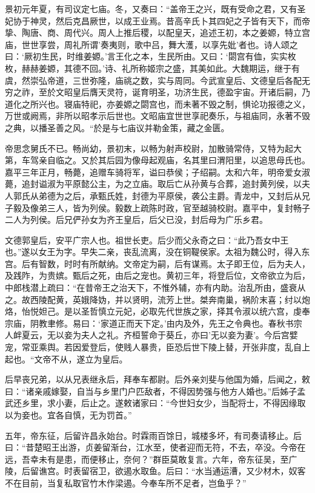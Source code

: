 \documentclass[12pt,UTF8]{ctexbook}
\begin{document}
景初元年夏，有司议定七庙。冬，又奏曰：“盖帝王之兴，既有受命之君，又有圣妃协于神灵，然后克昌厥世，以成王业焉。昔高辛氏卜其四妃之子皆有天下，而帝挚、陶唐、商、周代兴。周人上推后稷，以配皇天，追述王初，本之姜嫄，特立宫庙，世世享尝，周礼所谓'奏夷则，歌中吕，舞大濩，以享先妣'者也。诗人颂之曰：‘厥初生民，时维姜嫄。’言王化之本，生民所由。又曰：‘閟宫有侐，实实枚枚，赫赫姜嫄，其德不回。’诗、礼所称姬宗之盛，其美如此。大魏期运，继于有虞，然崇弘帝道，三世弥隆，庙祧之数，实与周同。今武宣皇后、文德皇后各配无穷之祚，至於文昭皇后膺天灵符，诞育明圣，功济生民，德盈宇宙。开诸后嗣，乃道化之所兴也。寝庙特祀，亦姜嫄之閟宫也，而未著不毁之制，惧论功报德之义，万世或阙焉，非所以昭孝示后世也。文昭庙宜世世享祀奏乐，与祖庙同，永著不毁之典，以播圣善之风。“於是与七庙议并勒金策，藏之金匮。

帝思念舅氏不已。畅尚幼，景初末，以畅为射声校尉，加散骑常侍，又特为起大第，车驾亲自临之。又於其后园为像母起观庙，名其里曰渭阳里，以追思母氏也。嘉平三年正月，畅薨，追赠车骑将军，谥曰恭侯；子绍嗣。太和六年，明帝爱女淑薨，追封谥淑为平原懿公主，为之立庙。取后亡从孙黄与合葬，追封黄列侯，以夫人郭氏从弟德为之后，承甄氏姓，封德为平原侯，袭公主爵。青龙中，又封后从兄子毅及像弟三人，皆为列侯。毅数上疏陈时政，官至越骑校尉。嘉平中，复封畅子二人为列侯。后兄俨孙女为齐王皇后，后父已没，封后母为广乐乡君。

文德郭皇后，安平广宗人也。祖世长吏。后少而父永奇之曰：“此乃吾女中王也。”遂以女王为字。早失二亲，丧乱流离，没在铜鞮侯家。太祖为魏公时，得入东宫。后有智数，时时有所献纳。文帝定为嗣，后有谋焉。太子即王位，后为夫人，及践阼，为贵嫔。甄后之死，由后之宠也。黄初三年，将登后位，文帝欲立为后，中郎栈潜上疏曰：“在昔帝王之治天下，不惟外辅，亦有内助。治乱所由，盛衰从之。故西陵配黄，英娥降妫，并以贤明，流芳上世。桀奔南巢，祸阶末喜；纣以炮烙，怡悦妲己。是以圣哲慎立元妃，必取先代世族之家，择其令淑以统六宫，虔奉宗庙，阴教聿修。易曰：‘家道正而天下定。’由内及外，先王之令典也。春秋书宗人衅夏云，无以妾为夫人之礼。齐桓誓命于葵丘，亦曰'无以妾为妻'。今后宫嬖宠，常亚乘舆。若因爱登后，使贱人暴贵，臣恐后世下陵上替，开张非度，乱自上起也。“文帝不从，遂立为皇后。

后早丧兄弟，以从兄表继永后，拜奉车都尉。后外亲刘斐与他国为婚，后闻之，敕曰：“诸亲戚嫁娶，自当与乡里门户匹敌者，不得因势强与他方人婚也。”后姊子孟武还乡里，求小妻，后止之。遂敕诸家曰：“今世妇女少，当配将士，不得因缘取以为妾也。宜各自慎，无为罚首。”

五年，帝东征，后留许昌永始台。时霖雨百馀日，城楼多坏，有司奏请移止。后曰：“昔楚昭王出游，贞姜留渐台，江水至，使者迎而无符，不去，卒没。今帝在远，吾幸未有是患，而便移止，奈何？”群臣莫敢复言。六年，帝东征吴，至广陵，后留谯宫。时表留宿卫，欲遏水取鱼。后曰：“水当通运漕，又少材木，奴客不在目前，当复私取官竹木作梁遏。今奉车所不足者，岂鱼乎？”
\end{document}
